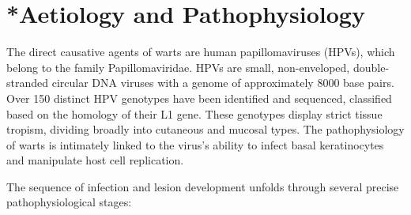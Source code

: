 \section{*{Aetiology and Pathophysiology}}
The direct causative agents of warts are human papillomaviruses (HPVs), which belong to the family Papillomaviridae. HPVs are small, non-enveloped, double-stranded circular DNA viruses with a genome of approximately 8000 base pairs. Over 150 distinct HPV genotypes have been identified and sequenced, classified based on the homology of their L1 gene. These genotypes display strict tissue tropism, dividing broadly into cutaneous and mucosal types. The pathophysiology of warts is intimately linked to the virus's ability to infect basal keratinocytes and manipulate host cell replication.

The sequence of infection and lesion development unfolds through several precise pathophysiological stages:
